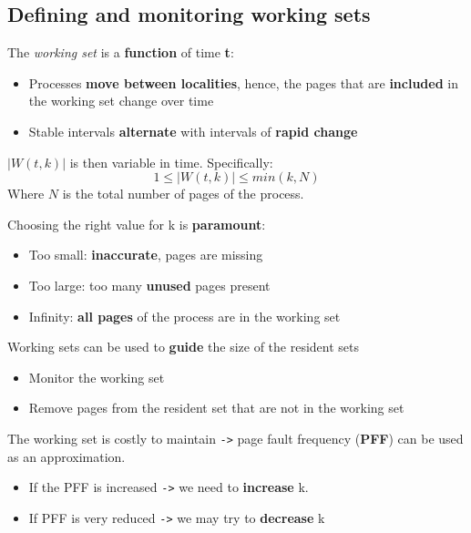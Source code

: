 \documentclass{article}
\begin{document}
\subsection{Defining and monitoring working sets}
\begin{flushleft}
The \textit{working set} is a \textbf{function} of time \textbf{t}:
\begin{itemize}
	\item Processes \textbf{move between localities}, hence, the pages that are \textbf{included} in the working set change over time 	
	\item Stable intervals \textbf{alternate} with intervals of \textbf{rapid change} 
\end{itemize}
$|W(t,k)|$ is then variable in time. Specifically: \[1 \leq |W(t,k)| \leq min(k,N) \]
Where $N$ is the total number of pages of the process.
\bigskip

Choosing the right value for k is \textbf{paramount}:
\begin{itemize}
	\item Too small: \textbf{inaccurate}, pages are missing
	\item Too large: too many \textbf{unused} pages present
	\item Infinity: \textbf{all pages} of the process are in the working set 
\end{itemize}
Working sets can be used to \textbf{guide} the size of the resident sets
\begin{itemize}
	\item Monitor the working set
	\item Remove pages from the resident set that are not in the working set 
\end{itemize}
The working set is costly to maintain \verb!->! page fault frequency (\textbf{PFF}) can be used as an approximation.
\begin{itemize}
	\item  If the PFF is increased \verb!->! we need to \textbf{increase} k.
	\item If PFF is very reduced \verb!->! we may try to \textbf{decrease} k
\end{itemize}
\end{flushleft}
\end{document}
